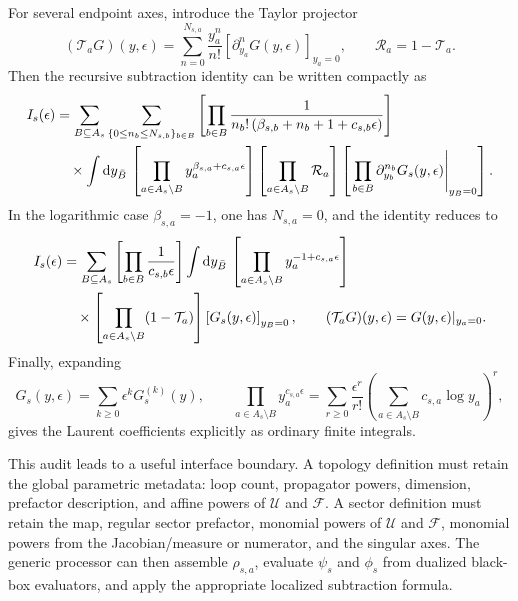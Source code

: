 \documentclass[11pt]{article}
\newcommand{\dd}{\mathrm d}
\newcommand{\eps}{\epsilon}
\newcommand{\U}{\mathcal U}
\newcommand{\F}{\mathcal F}
\begin{document}
For several endpoint axes, introduce the Taylor projector
\begin{equation}
  (\mathcal T_a G)(y,\eps)
  =
  \sum_{n=0}^{N_{s,a}}
  \frac{y_a^n}{n!}
  \left[
    \partial_{y_a}^nG(y,\eps)
  \right]_{y_a=0},
  \qquad
  \mathcal R_a=1-\mathcal T_a .
\end{equation}
Then the recursive subtraction identity can be written compactly as
\begin{align}
  \label{eq:recursive-subtraction}
  I_s(\eps)
  &=
  \sum_{B\subseteq A_s}
  \sum_{\{0\leq n_b\leq N_{s,b}\}_{b\in B}}
  \left[
    \prod_{b\in B}
    \frac{1}{
      n_b!\,
      (\beta_{s,b}+n_b+1+c_{s,b}\eps)
    }
  \right]
  \notag\\
  &\quad\times
  \int
  \dd y_{\bar B}\,
  \left[
    \prod_{a\in A_s\setminus B}
    y_a^{\beta_{s,a}+c_{s,a}\eps}
  \right]
  \left[
    \prod_{a\in A_s\setminus B}\mathcal R_a
  \right]
  \left[
    \left.
    \prod_{b\in B}\partial_{y_b}^{n_b}
    G_s(y,\eps)
    \right|_{y_B=0}
  \right].
\end{align}
In the logarithmic case \(\beta_{s,a}=-1\), one has \(N_{s,a}=0\), and the
identity reduces to
\begin{align}
  I_s(\eps)
  &=
  \sum_{B\subseteq A_s}
  \left[
    \prod_{b\in B}\frac{1}{c_{s,b}\eps}
  \right]
  \int
  \dd y_{\bar B}\,
  \left[
    \prod_{a\in A_s\setminus B}
    y_a^{-1+c_{s,a}\eps}
  \right]
  \notag\\
  &\quad\times
  \left[
    \prod_{a\in A_s\setminus B}(1-\mathcal T_a)
  \right]
  \left[
    G_s(y,\eps)
  \right]_{y_B=0},
  \qquad
  (\mathcal T_aG)(y,\eps)=G(y,\eps)|_{y_a=0}.
\end{align}
Finally, expanding
\begin{equation}
  G_s(y,\eps)=\sum_{k\geq0}\eps^k G_s^{(k)}(y),
  \qquad
  \prod_{a\in A_s\setminus B}y_a^{c_{s,a}\eps}
  =
  \sum_{r\geq0}
  \frac{\eps^r}{r!}
  \left(
    \sum_{a\in A_s\setminus B}c_{s,a}\log y_a
  \right)^r,
\end{equation}
gives the Laurent coefficients explicitly as ordinary finite integrals.

This audit leads to a useful interface boundary.  A topology definition must
retain the global parametric metadata: loop count, propagator powers,
dimension, prefactor description, and affine powers of \(\U\) and \(\F\).  A
sector definition must retain the map, regular sector prefactor, monomial
powers of \(\U\) and \(\F\), monomial powers from the Jacobian/measure or
numerator, and the singular axes.  The generic processor can then assemble
\(\rho_{s,a}\), evaluate \(\psi_s\) and \(\phi_s\) from dualized black-box
evaluators, and apply the appropriate localized subtraction formula.
\end{document}
